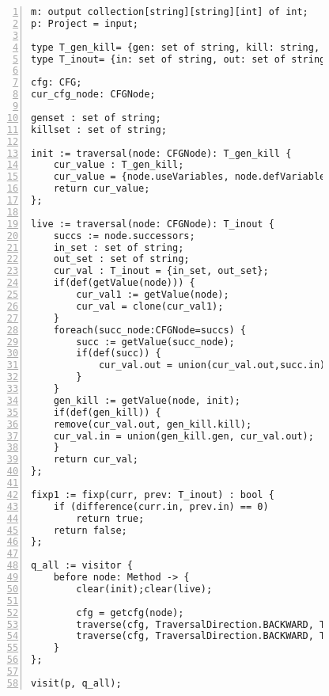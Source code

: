 \begin{figure}[ht!]
\begin{lstlisting}[numbers=left, tabsize=4, escapechar=@, caption={Live variable analysis},label={lst:live-variable}] 
m: output collection[string][string][int] of int;
p: Project = input;

type T_gen_kill= {gen: set of string, kill: string, dummy : int};
type T_inout= {in: set of string, out: set of string};

cfg: CFG;
cur_cfg_node: CFGNode;

genset : set of string;
killset : set of string;

init := traversal(node: CFGNode): T_gen_kill {
	cur_value : T_gen_kill;
	cur_value = {node.useVariables, node.defVariables, 0};
	return cur_value;
};

live := traversal(node: CFGNode): T_inout {
	succs := node.successors;
	in_set : set of string;
	out_set : set of string;
	cur_val : T_inout = {in_set, out_set};
	if(def(getValue(node))) {
		cur_val1 := getValue(node);
		cur_val = clone(cur_val1);
	}
	foreach(succ_node:CFGNode=succs) {
		succ := getValue(succ_node);
		if(def(succ)) {
			cur_val.out = union(cur_val.out,succ.in);
		}
	}
	gen_kill := getValue(node, init);
	if(def(gen_kill)) {
	remove(cur_val.out, gen_kill.kill);
	cur_val.in = union(gen_kill.gen, cur_val.out);
	}
	return cur_val;
};

fixp1 := fixp(curr, prev: T_inout) : bool {
	if (difference(curr.in, prev.in) == 0)
		return true;	
	return false;
};

q_all := visitor {
	before node: Method -> {
		clear(init);clear(live);

		cfg = getcfg(node);
		traverse(cfg, TraversalDirection.BACKWARD, TraversalKind.HYBRID, init);
		traverse(cfg, TraversalDirection.BACKWARD, TraversalKind.HYBRID, live, fixp1);
	}
};

visit(p, q_all);
\end{lstlisting}
\end{figure}